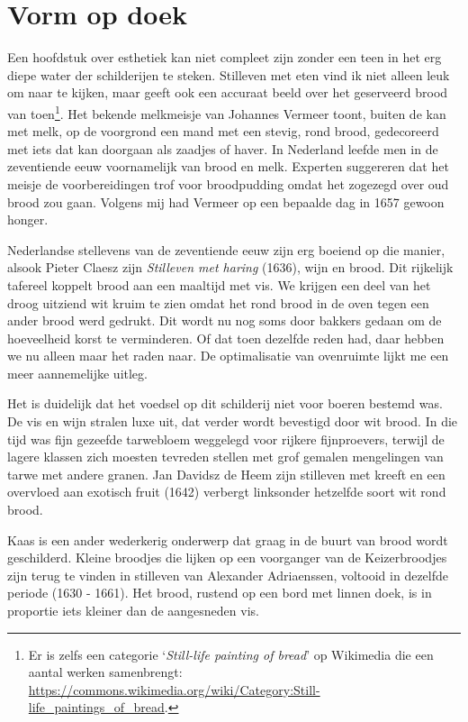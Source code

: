 \documentclass[
  11pt,
  dutch,
]{memoir}
\begin{document}
\hypertarget{vorm-op-doek}{%
\section{Vorm op doek}\label{vorm-op-doek}}

Een hoofdstuk over esthetiek kan niet compleet zijn zonder een teen in
het erg diepe water der schilderijen te steken. Stilleven met eten vind
ik niet alleen leuk om naar te kijken, maar geeft ook een accuraat beeld
over het geserveerd brood van toen\footnote{Er is zelfs een categorie
  `\emph{Still-life painting of bread}' op Wikimedia die een aantal
  werken samenbrengt:
  \url{https://commons.wikimedia.org/wiki/Category:Still-life_paintings_of_bread}.}.
Het bekende melkmeisje van Johannes Vermeer toont, buiten de kan met
melk, op de voorgrond een mand met een stevig, rond brood, gedecoreerd
met iets dat kan doorgaan als zaadjes of haver. In Nederland leefde men
in de zeventiende eeuw voornamelijk van brood en melk. Experten
suggereren dat het meisje de voorbereidingen trof voor broodpudding
omdat het zogezegd over oud brood zou gaan. Volgens mij had Vermeer op
een bepaalde dag in 1657 gewoon honger.

Nederlandse stellevens van de zeventiende eeuw zijn erg boeiend op die
manier, alsook Pieter Claesz zijn \emph{Stilleven met haring} (1636),
wijn en brood. Dit rijkelijk tafereel koppelt brood aan een maaltijd met
vis. We krijgen een deel van het droog uitziend wit kruim te zien omdat
het rond brood in de oven tegen een ander brood werd gedrukt. Dit wordt
nu nog soms door bakkers gedaan om de hoeveelheid korst te verminderen.
Of dat toen dezelfde reden had, daar hebben we nu alleen maar het raden
naar. De optimalisatie van ovenruimte lijkt me een meer aannemelijke
uitleg.

Het is duidelijk dat het voedsel op dit schilderij niet voor boeren
bestemd was. De vis en wijn stralen luxe uit, dat verder wordt bevestigd
door wit brood. In die tijd was fijn gezeefde tarwebloem weggelegd voor
rijkere fijnproevers, terwijl de lagere klassen zich moesten tevreden
stellen met grof gemalen mengelingen van tarwe met andere granen. Jan
Davidsz de Heem zijn stilleven met kreeft en een overvloed aan exotisch
fruit (1642) verbergt linksonder hetzelfde soort wit rond brood.

Kaas is een ander wederkerig onderwerp dat graag in de buurt van brood
wordt geschilderd. Kleine broodjes die lijken op een voorganger van de
Keizerbroodjes zijn terug te vinden in stilleven van Alexander
Adriaenssen, voltooid in dezelfde periode (1630 - 1661). Het brood,
rustend op een bord met linnen doek, is in proportie iets kleiner dan de
aangesneden vis.
\end{document}
